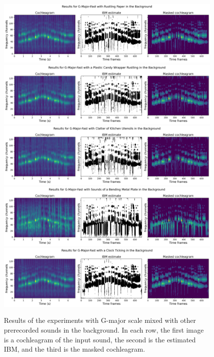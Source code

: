 \begin{figure}[htp]
	\centering
	\includegraphics[width=\textwidth]{include/experiments_G-major-fast_BG2.jpg}
	\includegraphics[width=\textwidth]{include/experiments_G-major-fast_BG3.jpg}
	\includegraphics[width=\textwidth]{include/experiments_G-major-fast_BG6.jpg}
	\includegraphics[width=\textwidth]{include/experiments_G-major-fast_BG17.jpg}
	\includegraphics[width=\textwidth]{include/experiments_G-major-fast_BG27.jpg}
	\caption[Results of experiments with other background sounds]{Results of the experiments with G-major scale mixed with other prerecorded sounds in the background. In each row, the first image is a cochleagram of the input sound, the second is the estimated IBM, and the third is the masked cochleagram.}
	\label{img:other_backgrounds_experiments}
\end{figure}

